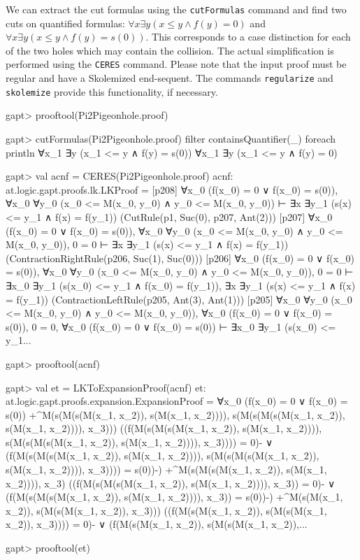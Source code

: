 \documentclass[a4paper,11pt]{book}
\renewcommand{\land}{\wedge}
\begin{document}
We can extract the cut formulas using the \texttt{cutFormulas} command and find two
cuts on quantified formulas: $\forall x \exists y (x \leq y \land f(y) = 0)$
and $\forall x \exists y (x \leq y \land f(y) = s(0))$.
This corresponds to a case distinction for each of the two holes which may contain the collision.
The actual simplification is performed using the \texttt{CERES} command. Please note
that the input proof must be regular and have a Skolemized end-sequent.
The commands \texttt{regularize} and \texttt{skolemize} provide this functionality,
if necessary.

\begin{clilisting}
gapt> prooftool(Pi2Pigeonhole.proof)

gapt> cutFormulas(Pi2Pigeonhole.proof) filter {containsQuantifier(_)} foreach println
∀x_1 ∃y (x_1 <= y ∧ f(y) = s(0))
∀x_1 ∃y (x_1 <= y ∧ f(y) = 0)

gapt> val acnf = CERES(Pi2Pigeonhole.proof)
acnf: at.logic.gapt.proofs.lk.LKProof =
[p208] ∀x_0 (f(x_0) = 0 ∨ f(x_0) = s(0)),
∀x_0 ∀y_0 (x_0 <= M(x_0, y_0) ∧ y_0 <= M(x_0, y_0))
⊢
∃x ∃y_1 (s(x) <= y_1 ∧ f(x) = f(y_1))    (CutRule(p1, Suc(0), p207, Ant(2)))
[p207] ∀x_0 (f(x_0) = 0 ∨ f(x_0) = s(0)),
∀x_0 ∀y_0 (x_0 <= M(x_0, y_0) ∧ y_0 <= M(x_0, y_0)),
0 = 0
⊢
∃x ∃y_1 (s(x) <= y_1 ∧ f(x) = f(y_1))    (ContractionRightRule(p206, Suc(1), Suc(0)))
[p206] ∀x_0 (f(x_0) = 0 ∨ f(x_0) = s(0)),
∀x_0 ∀y_0 (x_0 <= M(x_0, y_0) ∧ y_0 <= M(x_0, y_0)),
0 = 0
⊢
∃x_0 ∃y_1 (s(x_0) <= y_1 ∧ f(x_0) = f(y_1)),
∃x ∃y_1 (s(x) <= y_1 ∧ f(x) = f(y_1))    (ContractionLeftRule(p205, Ant(3), Ant(1)))
[p205] ∀x_0 ∀y_0 (x_0 <= M(x_0, y_0) ∧ y_0 <= M(x_0, y_0)),
∀x_0 (f(x_0) = 0 ∨ f(x_0) = s(0)),
0 = 0,
∀x_0 (f(x_0) = 0 ∨ f(x_0) = s(0))
⊢
∃x_0 ∃y_1 (s(x_0) <= y_1...

gapt> prooftool(acnf)

gapt> val et = LKToExpansionProof(acnf)
et: at.logic.gapt.proofs.expansion.ExpansionProof =
∀x_0 (f(x_0) = 0 ∨ f(x_0) = s(0))
  +^{M(s(M(s(M(x_1, x_2)), s(M(x_1, x_2)))),
        s(M(s(M(s(M(x_1, x_2)), s(M(x_1, x_2)))), x_3)))}
    ((f(M(s(M(s(M(x_1, x_2)), s(M(x_1, x_2)))),
                  s(M(s(M(s(M(x_1, x_2)), s(M(x_1, x_2)))), x_3)))) =
          0)- ∨
      (f(M(s(M(s(M(x_1, x_2)), s(M(x_1, x_2)))),
                  s(M(s(M(s(M(x_1, x_2)), s(M(x_1, x_2)))), x_3)))) =
          s(0))-)
  +^{M(s(M(s(M(x_1, x_2)), s(M(x_1, x_2)))), x_3)}
    ((f(M(s(M(s(M(x_1, x_2)), s(M(x_1, x_2)))), x_3)) = 0)- ∨
      (f(M(s(M(s(M(x_1, x_2)), s(M(x_1, x_2)))), x_3)) = s(0))-)
  +^{M(s(M(x_1, x_2)), s(M(s(M(x_1, x_2)), x_3)))}
    ((f(M(s(M(x_1, x_2)), s(M(s(M(x_1, x_2)), x_3)))) = 0)- ∨
      (f(M(s(M(x_1, x_2)), s(M(s(M(x_1, x_2)),...

gapt> prooftool(et)

\end{clilisting}
\end{document}
